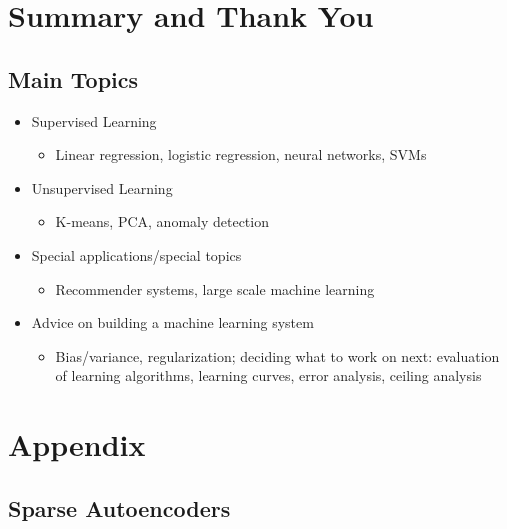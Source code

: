 \documentclass[a4paper,twoside,10pt]{article}
\begin{document}
\section{Summary and Thank You}
\subsection{Main Topics}
\begin{itemize}
  \item Supervised Learning
    \begin{itemize}
      \item Linear regression, logistic regression, neural networks, \acp{SVM}
    \end{itemize}
  \item Unsupervised Learning
    \begin{itemize}
      \item K-means, \ac{PCA}, anomaly detection
    \end{itemize}
  \item Special applications/special topics
    \begin{itemize}
      \item Recommender systems, large scale machine learning
    \end{itemize}
  \item Advice on building a machine learning system
    \begin{itemize}
      \item Bias/variance, regularization; deciding what to work on next: evaluation of learning algorithms, learning curves, error analysis, ceiling analysis
    \end{itemize}
\end{itemize}

\clearpage

\appendix
\section{Appendix}
\subsection{Sparse Autoencoders}
\end{document}
